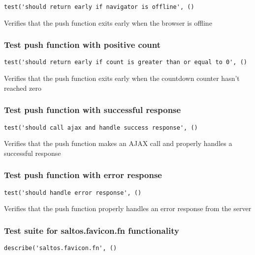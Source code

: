 \documentclass[a4paper]{article}
\begin{document}
\begin{lstlisting}
test('should return early if navigator is offline', ()
\end{lstlisting}

Verifies that the push function exits early when the browser
is offline

\hypertarget{toc686}{}
\subsubsection{Test push function with positive count}

\begin{lstlisting}
test('should return early if count is greater than or equal to 0', ()
\end{lstlisting}

Verifies that the push function exits early when the countdown
counter hasn't reached zero

\hypertarget{toc687}{}
\subsubsection{Test push function with successful response}

\begin{lstlisting}
test('should call ajax and handle success response', ()
\end{lstlisting}

Verifies that the push function makes an AJAX call and properly
handles a successful response

\hypertarget{toc688}{}
\subsubsection{Test push function with error response}

\begin{lstlisting}
test('should handle error response', ()
\end{lstlisting}

Verifies that the push function properly handles an error response
from the server

\hypertarget{toc689}{}
\subsubsection{Test suite for saltos.favicon.fn functionality}

\begin{lstlisting}
describe('saltos.favicon.fn', ()
\end{lstlisting}
\end{document}

